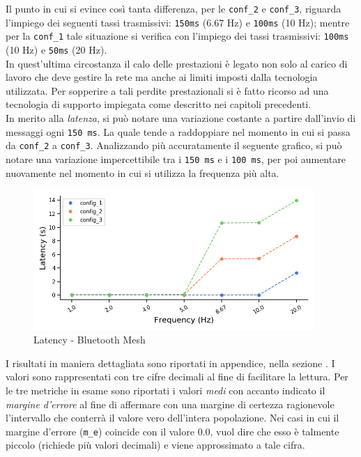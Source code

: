 \noindent Il punto in cui si evince così tanta differenza, per le \texttt{conf\_2} e \texttt{conf\_3}, riguarda l'impiego dei seguenti tassi trasmissivi: \texttt{150ms} (6.67 Hz) e \texttt{100ms} (10 Hz); mentre per la \texttt{conf\_1} tale situazione si verifica con l'impiego dei tassi trasmissivi: \texttt{100ms} (10 Hz) e \texttt{50ms} (20 Hz). \\
In quest'ultima circostanza il calo delle prestazioni è legato non solo al carico di lavoro che deve gestire la rete ma anche ai limiti imposti dalla tecnologia utilizzata. Per sopperire a tali perdite prestazionali si è fatto ricorso ad una tecnologia di supporto impiegata come descritto nei capitoli precedenti.\\

\noindent In merito alla \textit{latenza}, si può notare una variazione costante a partire dall'invio di messaggi ogni \texttt{150 ms}. La quale tende a raddoppiare nel momento in cui si passa da \texttt{conf\_2} a \texttt{conf\_3}. Analizzando più accuratamente il seguente grafico, si può notare una variazione impercettibile tra i \texttt{150 ms} e i \texttt{100 ms}, per poi aumentare nuovamente nel momento in cui si utilizza la frequenza più alta.

\begin{figure}[hbt!]
    \centering
    \includegraphics[width = 0.95\textwidth]{images/graphs/ble_latency.png}
    \caption{Latency - Bluetooth Mesh}
    \label{graph:ble_latency}
\end{figure}

\noindent I risultati in maniera dettagliata sono riportati in appendice, nella sezione . I valori sono rappresentati con tre cifre decimali al fine di facilitare la lettura. Per le tre metriche in esame sono riportati i valori \textit{medi} con accanto indicato il \textit{margine d'errore} al fine di affermare con una margine di certezza ragionevole l'intervallo che conterrà il valore vero dell'intera popolazione. Nei casi in cui il margine d'errore (\texttt{m\_e}) coincide con il valore $0.0$, vuol dire che esso è talmente piccolo (richiede più valori decimali) e viene approssimato a tale cifra.

